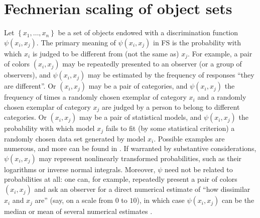\documentclass[nojss]{jss}
\begin{document}
\section{Fechnerian scaling of object sets}
\label{sec:FS}

Let $\left\{ x_{1},\ldots,x_{n}\right\} $ be a set
of objects endowed with a discrimination function $\psi\left(x_{i},x_{j}\right)$.
The primary meaning of $\psi\left(x_{i},x_{j}\right)$ in FS is the
probability with which $x_{i}$ is judged to be different from (not
the same as) $x_{j}$. For example, a pair of colors $\left(x_{i},x_{j}\right)$
may be repeatedly presented to an observer (or a group of observers),
and $\psi\left(x_{i},x_{j}\right)$ may be estimated by the frequency
of responses ``they are different''. Or $\left(x_{i},x_{j}\right)$
may be a pair of categories, and $\psi\left(x_{i},x_{j}\right)$ the
frequency of times a randomly chosen exemplar of category $x_{i}$
and a randomly chosen exemplar of category $x_{j}$ are judged by
a person to belong to different categories. Or $\left(x_{i},x_{j}\right)$
may be a pair of statistical models, and $\psi\left(x_{i},x_{j}\right)$
the probability with which model $x_{j}$ fails to fit
(by some statistical criterion) a randomly chosen data set generated
by model $x_{i}$. Possible examples are numerous, and more can be
found in \cite{DzhCol2006a}. If warranted by substantive considerations,
$\psi\left(x_{i},x_{j}\right)$ may represent nonlinearly transformed
probabilities, such as their logarithms or inverse normal integrals.
Moreover, $\psi$ need not be related to probabilities at all: one
can, for example, repeatedly present a pair of colors $\left(x_{i},x_{j}\right)$
and ask an observer for a direct numerical estimate of {}``how dissimilar
$x_{i}$ and $x_{j}$ are'' (say, on a scale from $0$ to $10$), in which
case $\psi\left(x_{i},x_{j}\right)$ can be the median or mean of
several numerical estimates \citep[this procedure is commonly used for the
purposes of multidimensional scaling, MDS; see, e.g.,][]{KruskWish1978}.
\end{document}
